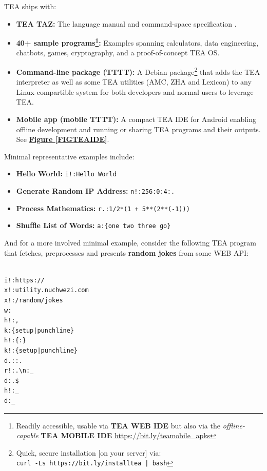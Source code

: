 \documentclass[sigplan,screen]{acmart}
\begin{document}
TEA ships with:
\begin{itemize}
  \item \textbf{TEA TAZ:} The language manual and command-space specification \cite{Lutalo2024TEATAZ}.
  \item \textbf{40+ sample programs\footnote{Readily accessible, usable via \textbf{TEA WEB IDE} but also via the \textit{offline-capable} \textbf{TEA MOBILE IDE} \url{https://bit.ly/teamobile_apks}}:} Examples spanning calculators, data engineering, chatbots, games, cryptography, and a proof-of-concept TEA OS.
    \item \textbf{Command-line package (TTTT):} A Debian package\footnote{Quick, secure installation [on your server] via:\\ \texttt{curl -Ls https://bit.ly/installtea | bash}} that adds the TEA interpreter as well as some TEA utilities (AMC, ZHA and Lexicon) to any Linux-compartible system for both developers and normal users to leverage TEA.
  \item \textbf{Mobile app (mobile TTTT):} A compact TEA IDE for Android enabling offline development and running or sharing TEA programs and their outputs. See \textbf{\hyperref[FIGTEAIDE]{Figure \ref{FIGTEAIDE}}}.
\end{itemize}

Minimal representative examples include:
\begin{itemize}
  \item \textbf{Hello World:} \texttt{i!:Hello World}
  \item \textbf{Generate Random IP Address:} \texttt{n!:256:0:4:.}
  \item \textbf{Process Mathematics:} \texttt{r.:{1/2*(1 + 5**(2**(-1)))}}
  \item \textbf{Shuffle List of Words:} \texttt{a:\{one two three go\}}
\end{itemize}

And for a more involved minimal example, consider the following TEA program that fetches, preprocesses and presents \textbf{random jokes} from some WEB API:


\begin{lstlisting}[style=tea,caption=EDUTAINMENT: Random Jokes v2.1,label=LST2]                    
                   
i!:https://
x!:utility.nuchwezi.com
x!:/random/jokes
w:
h!:,
k:{setup|punchline}
h!:{:}
k!:{setup|punchline}
d.::.
r!:.\n:_
d:.$
h!:_
d:_
\end{lstlisting}
\end{document}
